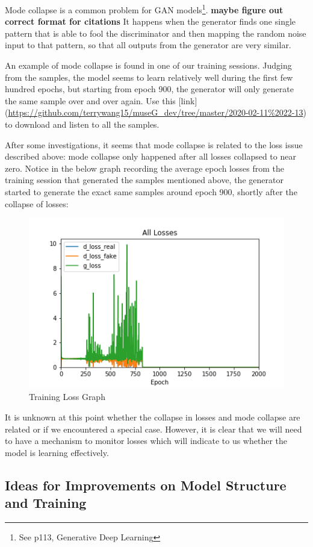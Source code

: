 \documentclass[12pt,oneside]{chicagocapstone}
\begin{document}
Mode collapse is a common problem for GAN models\footnote{See p113, Generative Deep Learning}. \textbf{maybe figure out correct format for citations} It happens when the generator finds one single pattern that is able to fool the discriminator and then mapping the random noise input to that pattern, so that all outputs from the generator are very similar.

An example of mode collapse is found in one of our training sessions. Judging from the samples, the model seems to learn relatively well during the first few hundred epochs, but starting from epoch 900, the generator will only generate the same sample over and over again. Use this {[}link{]} (\url{https://github.com/terrywang15/museG_dev/tree/master/2020-02-11\%2022-13}) to download and listen to all the samples.

After some investigations, it seems that mode collapse is related to the loss issue described above: mode collapse only happened after all losses collapsed to near zero. Notice in the below graph recording the average epoch losses from the training session that generated the samples mentioned above, the generator started to generate the exact same samples around epoch 900, shortly after the collapse of losses:
\begin{figure}

{\centering \includegraphics[width=0.3\linewidth]{figure/all_losses_2} 

}

\caption{Training Loss Graph}\label{fig:unnamed-chunk-4}
\end{figure}
It is unknown at this point whether the collapse in losses and mode collapse are related or if we encountered a special case. However, it is clear that we will need to have a mechanism to monitor losses which will indicate to us whether the model is learning effectively.

\hypertarget{ideas-for-improvements-on-model-structure-and-training}{%
\subsection*{Ideas for Improvements on Model Structure and Training}\label{ideas-for-improvements-on-model-structure-and-training}}
\end{document}
